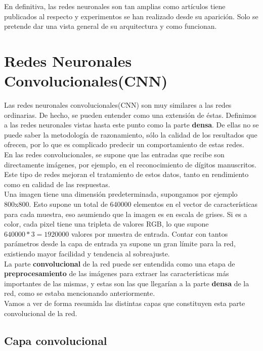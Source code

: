 \documentclass[11pt,fleqn]{book} %
\begin{document}
En definitiva, las redes neuronales son tan amplias como artículos tiene publicados al respecto y experimentos se han realizado desde su aparición. Solo se pretende dar una vista general de su arquitectura y como funcionan. 

\section{Redes Neuronales Convolucionales(CNN)}\label{sec:convolucional}

Las redes neuronales convolucionales(CNN) son muy similares a las redes ordinarias. De hecho, se pueden entender como una extensión de éstas. Definimos a las redes neuronales vistas hasta este punto como la parte \textbf{densa}. De ellas no se puede saber la metodología de razonamiento, sólo la calidad de los resultados que ofrecen, por lo que es complicado predecir un comportamiento de estas redes. \\

En las redes convolucionales, se supone que las entradas que recibe son directamente imágenes, por ejemplo, en el reconocimiento de dígitos manuscritos. Este tipo de redes mejoran el tratamiento de estos datos, tanto en rendimiento como en calidad de las respuestas. \\

Una imagen tiene una dimensión predeterminada, supongamos por ejemplo 800x800. Esto supone un total de 640000 elementos en el vector de características para cada muestra, eso asumiendo que la imagen es en escala de grises. Si es a color, cada pixel tiene una tripleta de valores RGB, lo que supone $640000*3=1920000$ valores por muestra de entrada. Contar con tantos parámetros desde la capa de entrada ya supone un gran límite para la red, existiendo mayor facilidad y tendencia al sobreajuste. \\

La parte \textbf{convolucional} de la red puede ser entendida como una etapa de \textbf{preprocesamiento} de las imágenes para extraer las características más importantes de las mismas, y estas son las que llegarían a la parte \textbf{densa} de la red, como se estaba mencionando anteriormente. \\

Vamos a ver de forma resumida las distintas capas que constituyen esta parte convolucional de la red.

\subsection{Capa convolucional}\label{sec:convolucional2}
\end{document}
